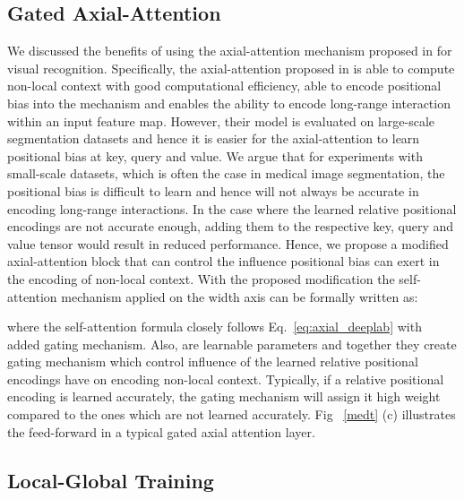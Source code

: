 \documentclass[runningheads]{llncs}
\begin{document}
	\subsection{Gated Axial-Attention} We discussed the benefits of using the axial-attention mechanism proposed in \cite{wang2020axial} for visual recognition. Specifically, the axial-attention proposed in \cite{wang2020axial} is able to compute non-local context with good computational efficiency, able to encode positional bias into the mechanism and enables the ability to encode long-range interaction within an input feature map. However, their model is evaluated on large-scale segmentation datasets and hence it is easier for the axial-attention to learn positional bias at key, query and value. We argue that for experiments with small-scale datasets, which is often the case in medical image segmentation, the positional bias is difficult to learn and hence will not always be accurate in encoding long-range interactions. In the case where the learned relative positional encodings are not accurate enough, adding them to the respective key, query and value tensor would result in reduced performance. Hence, we propose a modified axial-attention block that can control the influence positional bias can exert in the encoding of non-local context. With the proposed modification the self-attention mechanism applied on the width axis can be formally written as:
	
	where the self-attention formula closely follows Eq.~\ref{eq:axial_deeplab} with added gating mechanism. Also,  are learnable parameters and together they create gating mechanism which control influence of the learned relative positional encodings have on encoding non-local context. Typically, if a relative positional encoding is learned accurately, the gating mechanism will assign it high weight compared to the ones which are not learned accurately. Fig ~\ref{medt} (c) illustrates the feed-forward in a typical gated axial attention layer.
	
	\subsection{Local-Global Training}
\end{document}
